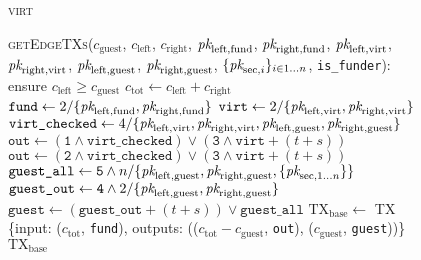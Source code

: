 \begin{figure}[H]
  \begin{processbox}{\textsc{virt}}
    \begin{algorithmic}[1]
      \State {}
      \State \textsc{getEdgeTXs}($c_{\mathrm{guest}}$, $c_{\mathrm{left}}$,
      $c_{\mathrm{right}}$, $\textit{pk}_{\mathrm{left}, \mathrm{fund}}$,
      $\textit{pk}_{\mathrm{right}, \mathrm{fund}}$, $\textit{pk}_{\mathrm{left}, \mathrm{virt}}$,
      $\textit{pk}_{\mathrm{right}, \mathrm{virt}}$, $\textit{pk}_{\mathrm{left},
      \mathrm{guest}}$, $\textit{pk}_{\mathrm{right}, \mathrm{guest}}$,
      $\{\textit{pk}_{\mathrm{sec}, i}\}_{i \in 1 \dots n}$, \texttt{is\_funder}):
      \Indent
        \State ensure $c_{\mathrm{left}} \geq c_{\mathrm{guest}}$
        \State $c_{\mathrm{tot}} \gets c_{\mathrm{left}} + c_{\mathrm{right}}$
        \State $\texttt{fund} \gets 2/\{\textit{pk}_{\mathrm{left}, \mathrm{fund}},
        \textit{pk}_{\mathrm{right}, \mathrm{fund}}\}$
        \State $\texttt{virt} \gets 2/\{\textit{pk}_{\mathrm{left}, \mathrm{virt}},
        \textit{pk}_{\mathrm{right}, \mathrm{virt}}\}$
        \State $\texttt{virt\_checked} \gets 4/\{\textit{pk}_{\mathrm{left},
        \mathrm{virt}}, \textit{pk}_{\mathrm{right}, \mathrm{virt}}, \textit{pk}_{\mathrm{left},
        \mathrm{guest}}, \textit{pk}_{\mathrm{right}, \mathrm{guest}}\}$
          \State $\texttt{out} \gets (\texttt{1} \wedge \texttt{virt\_checked})
          \vee (\texttt{3} \wedge \texttt{virt} + (t + s))$
        \Else \: 
          \State $\texttt{out} \gets (\texttt{2} \wedge \texttt{virt\_checked})
          \vee (\texttt{3} \wedge \texttt{virt} + (t + s))$
        \EndIf
        \State $\texttt{guest\_all} \gets \texttt{5} \wedge
        n/\{\textit{pk}_{\mathrm{left}, \mathrm{guest}}, \textit{pk}_{\mathrm{right},
        \mathrm{guest}}, \{\textit{pk}_{\mathrm{sec}, 1 \dots n}\}\}$
        \State $\texttt{guest\_out} \gets \texttt{4} \wedge
        2/\{\textit{pk}_{\mathrm{left}, \mathrm{guest}}, \textit{pk}_{\mathrm{right},
        \mathrm{guest}}\}$
        \State $\texttt{guest} \gets (\texttt{guest\_out} + (t + s)) \vee
        \texttt{guest\_all}$
        \State $\mathrm{TX}_{\mathrm{base}} \gets$ TX \{input:
        ($c_{\mathrm{tot}}$, \texttt{fund}), outputs: (($c_{\mathrm{tot}} -
        c_{\mathrm{guest}}$, \texttt{out}), ($c_{\mathrm{guest}}$,
        \texttt{guest}))\}
        \State \Return $\mathrm{TX}_{\mathrm{base}}$
      \EndIndent
    \end{algorithmic}
  \end{processbox}
  \caption{}
  \label{code:virtual-layer:edge-txs}
\end{figure}

